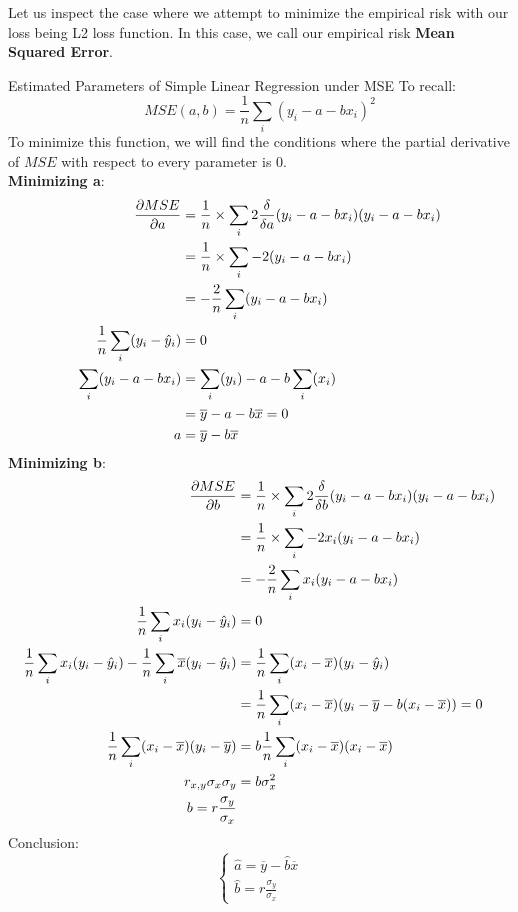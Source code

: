 Let us inspect the case where we attempt to minimize the empirical risk with our loss being L2 loss function. In this case, we call our empirical risk \textbf{Mean Squared Error}.
\begin{ln-derive}{Estimated Parameters of Simple Linear Regression under MSE}{}
    To recall:
    \[MSE(a, b) = \frac{1}{n} \sum_i {(y_i - a - b x_i)}^2\]
    To minimize this function, we will find the conditions where the partial derivative of $MSE$ with respect to every parameter is $0$. \\
    \textbf{Minimizing a}: \\
    \begin{align*}
        \pdv{MSE}{a} &= \frac{1}{n} \times \sum_i 2\frac{\delta}{\delta a}(y_i - a - b x_i)(y_i - a - b x_i) \\
        &= \frac{1}{n} \times \sum_i -2(y_i - a - b x_i) \\
        &= -\frac{2}{n} \sum_i (y_i - a - b x_i) \\
        \frac{1}{n} \sum_i (y_i - \hat{y}_i) &= 0 \\
        \sum_i (y_i - a - b x_i)
        &= \sum_i (y_i) - a - b\sum_i (x_i) \\
        &= \overline{y} - a - b \overline{x} = 0 \\
        a &= \overline{y} - b \overline{x}
    \end{align*}
    \textbf{Minimizing b}: \\
    \begin{align*}
        \pdv{MSE}{b} &= \frac{1}{n} \times \sum_i 2\frac{\delta}{\delta b}(y_i - a - b x_i)(y_i - a - b x_i) \\
        &= \frac{1}{n} \times \sum_i -2x_i(y_i - a - b x_i) \\
        &= -\frac{2}{n} \sum_i x_i(y_i - a - b x_i) \\
        \frac{1}{n} \sum_i x_i(y_i - \hat{y}_i) &= 0 \\
        \frac{1}{n} \sum_i x_i(y_i - \hat{y}_i) - \frac{1}{n} \sum_i \overline{x} (y_i - \hat{y}_i)
        &= \frac{1}{n} \sum_i (x_i - \overline{x}) (y_i - \hat{y}_i) \\
        &= \frac{1}{n} \sum_i (x_i - \overline{x}) (y_i - \overline{y} - b(x_i - \overline{x})) = 0 \\
        \frac{1}{n} \sum_i (x_i - \overline{x}) (y_i - \overline{y})
        &= b \frac{1}{n} \sum_i (x_i - \overline{x}) (x_i - \overline{x}) \\
        r_{x, y} \sigma_x \sigma_y &= b \sigma_x^2 \\
        b = r \frac{\sigma_y}{\sigma_x}
    \end{align*}
    \tcblower
    Conclusion:
    \[
        \begin{cases}
            \hat{a} = \overline{y} - \hat{b} \overline{x} \\
            \hat{b} = r \frac{\sigma_y}{\sigma_x}
        \end{cases}
    \]
\end{ln-derive}
